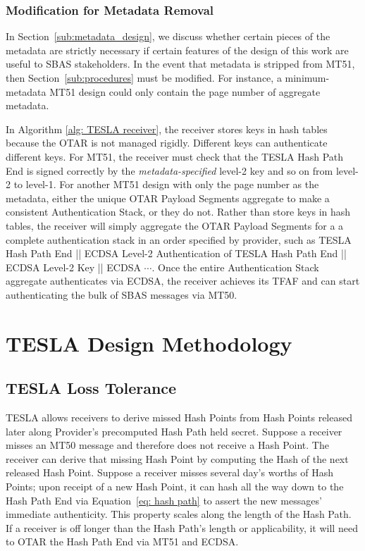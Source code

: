 \documentclass[APA,STIX1COL]{IONjournal/ION-APA Template}
\begin{document}
		\subsubsection{Modification for Metadata Removal}

			In Section~\ref{sub:metadata_design}, we discuss whether certain pieces of the metadata are strictly necessary if certain features of the design of this work are useful to SBAS stakeholders.
			In the event that metadata is stripped from MT51, then Section~\ref{sub:procedures} must be modified.
			For instance, a minimum-metadata MT51 design could only contain the page number of aggregate metadata.

			In Algorithm \ref{alg: TESLA receiver}, the receiver stores keys in hash tables because the OTAR is not managed rigidly.
			Different keys can authenticate different keys.
			For MT51, the receiver must check that the TESLA Hash Path End is signed correctly by the {\em metadata-specified} level-2 key and so on from level-2 to level-1. 
			For another MT51 design with only the page number as the metadata, either the unique OTAR Payload Segments aggregate to make a consistent Authentication Stack, or they do not.
			Rather than store keys in hash tables, the receiver will simply aggregate the OTAR Payload Segments for a a complete authentication stack in an order specified by provider, such as TESLA Hash Path End || ECDSA Level-2 Authentication of TESLA Hash Path End || ECDSA Level-2 Key || ECDSA $\cdots$.
			Once the entire Authentication Stack aggregate authenticates via ECDSA, the receiver achieves its TFAF and can start authenticating the bulk of SBAS messages via MT50.

\section{TESLA Design Methodology} \label{sec:tesla_design_methodology}

	\subsection{TESLA Loss Tolerance} \label{sub:tesla_loss_tolerance}

		TESLA allows receivers to derive missed Hash Points from Hash Points released later along Provider's precomputed Hash Path held secret.
		Suppose a receiver misses an MT50 message and therefore does not receive a Hash Point.
		The receiver can derive that missing Hash Point by computing the Hash of the next released Hash Point.
		Suppose a receiver misses several day's worths of Hash Points; upon receipt of a new Hash Point, it can hash all the way down to the Hash Path End via Equation~\eqref{eq: hash path} to assert the new messages' immediate authenticity.
		This property scales along the length of the Hash Path.
		If a receiver is off longer than the Hash Path's length or applicability, it will need to OTAR the Hash Path End via MT51 and ECDSA.
\end{document}

